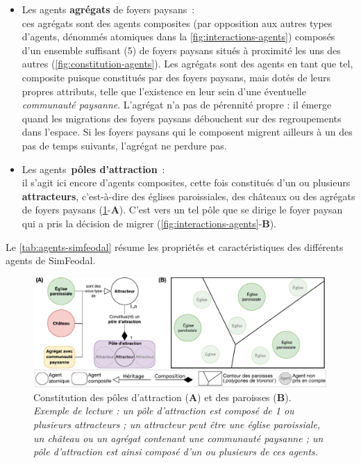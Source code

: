 \begin{itemize}
	\item Les agents \og \textbf{agrégats} de foyers paysans\fg{} : \\
	ces agrégats sont des agents \og composites\fg{} (par opposition aux autres types d'agents, dénommés \og atomiques\fg{} dans la \cref{fig:interactions-agents}) composés d'un ensemble suffisant (5) de foyers paysans situés à proximité les uns des autres (\cref{fig:constitution-agents}).
	Les agrégats sont des agents en tant que tel, composite puisque constitués par des foyers paysans, mais dotés de leurs propres attributs, telle que l'existence en leur sein d'une éventuelle \textit{communauté paysanne}.
	L'agrégat n'a pas de pérennité propre : il émerge quand les migrations des foyers paysans débouchent sur des regroupements dans l'espace.
	Si les foyers paysans qui le composent migrent ailleurs à un des pas de temps suivants, l'agrégat ne perdure pas.
	
	\item Les agents \og \textbf{pôles d'attraction}\fg{} : \\
	il s'agit ici encore d'agents composites, cette fois constitués d'un ou plusieurs \textbf{attracteurs}, c'est-à-dire des églises paroissiales, des châteaux ou des agrégats de foyers paysans (\cref{fig:constitution-poles-paroisses}-\textbf{A}).
	C'est vers un tel pôle que se dirige le foyer paysan qui a pris la décision de migrer (\cref{fig:interactions-agents}-\textbf{B}).
\end{itemize}

Le \cref{tab:agents-simfeodal} résume les propriétés et caractéristiques des différents agents de SimFeodal.

	\begin{figure}[H]
	\centering
	\includegraphics[width=\linewidth]{img/agents_paroisses_poles.pdf}
	\caption[Constitution des pôles d'attraction et des paroisses.]{Constitution des pôles d'attraction (\textbf{A}) et des paroisses (\textbf{B}).\\
		\textit{Exemple de lecture : un pôle d'attraction est composé de 1 ou plusieurs attracteurs ;
			un attracteur peut être une église paroissiale, un château ou un agrégat contenant une communauté paysanne ;
			un pôle d'attraction est ainsi composé d'un ou plusieurs de ces agents.}}
	\label{fig:constitution-poles-paroisses}
\end{figure}




